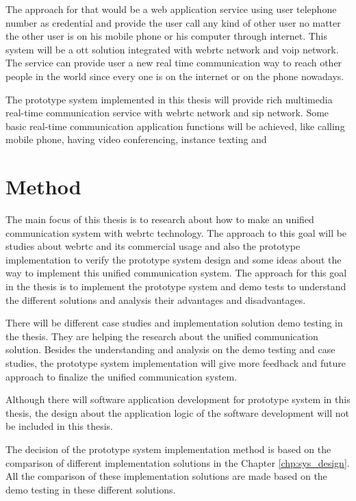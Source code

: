 \par The approach for that would be a web application service using user telephone number as credential and provide the user call any kind of other user no matter the other user is on his mobile phone or his computer through internet. This system will be a \gls{ott} solution integrated with \gls{webrtc} network and \gls{voip} network. The service can provide user a new real time communication way to reach other people in the world since every one is on the internet or on the phone nowadays.

\par The prototype system implemented in this thesis will provide rich multimedia real-time communication service with \gls{webrtc} network and \gls{sip} network. Some basic real-time communication application functions will be achieved, like calling mobile phone, having video conferencing, instance texting and 

\section{Method}

\noindent The main focus of this thesis is to research about how to make an unified communication system with \gls{webrtc} technology. The approach to this goal will be studies about \gls{webrtc} and its commercial usage and also the prototype implementation to verify the prototype system design and some ideas about the way to implement this unified communication system. The approach for this goal in the thesis is to implement the prototype system and demo tests to understand the different solutions and analysis their advantages and disadvantages.

\par There will be different case studies and implementation solution demo testing in the thesis. They are helping the research about the unified communication solution. Besides the understanding and analysis on the demo testing and case studies, the prototype system implementation will give more feedback and future approach to finalize the unified communication system.

\par Although there will software application development for prototype system in this thesis, the design about the application logic of the software development will not be included in this thesis.

\par The decision of the prototype system implementation method is based on the comparison of different implementation solutions in the Chapter \ref{chp:sys_design}. All the comparison of these implementation solutions are made based on the demo testing in these different solutions.


